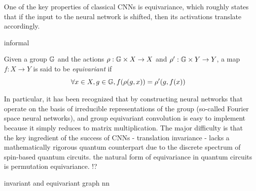 One of the key properties of classical CNNs is equivariance, which roughly states that if the input to the neural network is shifted, then its activations translate accordingly. 
\cite{cohenGroupEquivariantConvolutional2016}
\cite{kondorCovariantCompositionalNetworks2018}
\begin{definition}[Covariant]
\end{definition}
\begin{definition}[Invariant]
	informal
\end{definition}
\begin{definition}[Equivariant]\label{def:equivariant}
	Given a group $\mathbb{G}$ and the actions $\rho: \mathbb{G} \times X\to X$ and $\rho': \mathbb{G} \times Y\to Y$,
	a map $f: X\to Y$ is said to be \emph{equivariant} if
	\begin{equation}
		\forall x\in X, g\in \mathbb{G},
		f(\rho(g,x)) = \rho'(g,f(x))
	\end{equation}
\end{definition}
\begin{remark}
	In particular, it has been recognized that by constructing neural networks that operate on the basis of irreducible representations of the group (so-called Fourier space neural networks), and group equivariant convolution is easy to implement because it simply reduces to matrix multiplication.
	The major difficulty is that the key ingredient of the success of CNNs - translation invariance - lacks a mathematically rigorous quantum counterpart due to the discrete spectrum of spin-based quantum circuits.
	the natural form of equivariance in quantum circuits is permutation equivariance.
	\cite{zhengSpeedingLearningQuantum2022}!?
\end{remark}
invariant and equivariant graph nn
\cite{maronInvariantEquivariantGraph2019}

